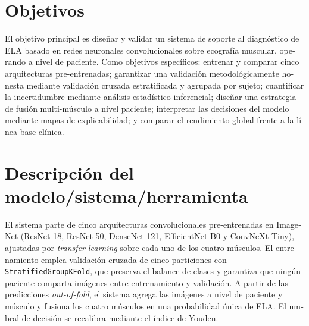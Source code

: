 \documentclass[12pt]{extarticle}
\numberwithin{equation}{section}
\newcommand{\sectionnotoc}[1]{%
    \refstepcounter{section}%
    \section*{\thesection\quad #1}%
}
\begin{document}
\begin{otherlanguage}{spanish}
\begin{refsection}
\sectionnotoc{Objetivos}

El objetivo principal es dise\~nar y validar un sistema de soporte al diagn\'ostico de ELA basado en redes neuronales convolucionales sobre ecograf\'ia muscular, operando a nivel de paciente. Como objetivos espec\'ificos: entrenar y comparar cinco arquitecturas pre-entrenadas; garantizar una validaci\'on metodol\'ogicamente honesta mediante validaci\'on cruzada estratificada y agrupada por sujeto; cuantificar la incertidumbre mediante an\'alisis estad\'istico inferencial; dise\~nar una estrategia de fusi\'on multi-m\'usculo a nivel paciente; interpretar las decisiones del modelo mediante mapas de explicabilidad; y comparar el rendimiento global frente a la l\'inea base cl\'inica.

\sectionnotoc{Descripci\'on del modelo/sistema/herramienta}

El sistema parte de cinco arquitecturas convolucionales pre-entrenadas en ImageNet (ResNet-18, ResNet-50, DenseNet-121, EfficientNet-B0 y ConvNeXt-Tiny), ajustadas por \textit{transfer learning} sobre cada uno de los cuatro m\'usculos. El entrenamiento emplea validaci\'on cruzada de cinco particiones con \texttt{Stratified\allowbreak Group\allowbreak KFold}, que preserva el balance de clases y garantiza que ning\'un paciente comparta im\'agenes entre entrenamiento y validaci\'on. A partir de las predicciones \textit{out-of-fold}, el sistema agrega las im\'agenes a nivel de paciente y m\'usculo y fusiona los cuatro m\'usculos en una probabilidad \'unica de ELA. El umbral de decisi\'on se recalibra mediante el \'indice de Youden.

\begin{figure}[H]
    \centering
\end{figure}
\end{refsection}
\end{otherlanguage}
\end{document}
